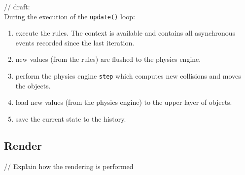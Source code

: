 \documentclass[11pt,a4paper]{article}
\begin{document}
// draft:\\
During the execution of the \texttt{update()} loop:
\begin{enumerate}
\item execute the rules. The context is available and contains all asynchronous events recorded since the last iteration.
\item new values (from the rules) are flushed to the physics engine.
\item perform the physics engine \texttt{step} which computes new collisions and moves the objects.
\item load new values (from the physics engine) to the upper layer of objects.
\item save the current state to the history.
\end{enumerate}

\subsection{Render}

// Explain how the rendering is performed
\end{document}
